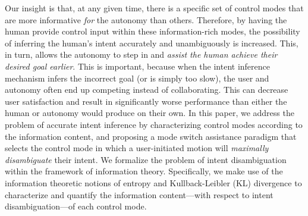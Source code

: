 \documentclass[conference]{IEEEtran}
\begin{document}
Our insight is that, at any given time, there is a specific set of control modes that are more informative \textit{for} the autonomy than others. Therefore, by having the human provide control input within these information-rich modes, the possibility of inferring the human's intent accurately and unambiguously is increased. This, in turn, allows the autonomy to step in and \textit{assist the human achieve their desired goal earlier}.  This is important, because when the intent inference mechanism infers the incorrect goal (or is simply too slow), the user and autonomy often end up competing instead of collaborating. This can decrease user satisfaction and result in significantly worse performance than either the human or autonomy would produce on their own. In this paper, we address the problem of accurate intent inference by characterizing control modes according to the information content, and proposing a mode switch assistance paradigm that selects the control mode in which a user-initiated motion will \textit{maximally disambiguate} their intent. We formalize the problem of intent disambiguation within the framework of information theory. Specifically, we make use of the information theoretic notions of entropy and Kullback-Leibler (KL) divergence to characterize and quantify the information content---with respect to intent disambiguation---of each control mode.

\end{document}
